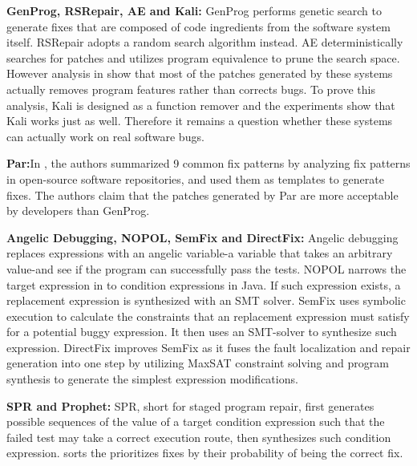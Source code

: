 \textbf{GenProg, RSRepair, AE and Kali:}
GenProg\cite{6035728}\cite{6227211} performs genetic search to generate fixes that are composed of code ingredients from the software system itself. RSRepair\cite{Qi:2014:SRS:2568225.2568254} adopts a random search algorithm instead. AE\cite{6693094} deterministically searches for patches and utilizes program equivalence to prune the search space. However analysis in \cite{qi2015analysis} show that most of the patches generated by these systems actually removes program features rather than corrects bugs. To prove this analysis, Kali\cite{qi2015analysis} is designed as a function remover and the experiments show that Kali works just as well. Therefore it remains a question whether these systems can actually work on real software bugs.

\textbf{Par:}In \cite{kim2013automatic}, the authors summarized 9 common fix patterns by analyzing fix patterns in open-source software repositories, and used them as templates to generate fixes. The authors claim that the patches generated by Par are more acceptable by developers than GenProg.

\textbf{Angelic Debugging, NOPOL, SemFix and DirectFix:} Angelic debugging\cite{chandra2011angelic} replaces expressions with an angelic variable-a variable that takes an arbitrary value-and see if the program can successfully pass the tests. NOPOL\cite{demarco2014automatic} narrows the target expression in \cite{chandra2011angelic} to condition expressions in Java. If such expression exists, a replacement expression is synthesized with an SMT solver. SemFix\cite{nguyen2013semfix} uses symbolic execution to calculate the constraints that an replacement expression must satisfy for a potential buggy expression. It then uses an SMT-solver to synthesize such expression. DirectFix\cite{mechtaev2015directfix} improves SemFix as it fuses the fault localization and repair generation into one step by utilizing MaxSAT constraint solving and program synthesis to generate the simplest expression modifications.

\textbf{SPR and Prophet:} SPR, short for staged program repair\cite{Long:2015:SPR:2786805.2786811}, first generates possible sequences of the value of a target condition expression such that the failed test may take a correct execution route, then synthesizes such condition expression. \cite{long2016automatic} sorts the prioritizes fixes by their probability of being the correct fix.

